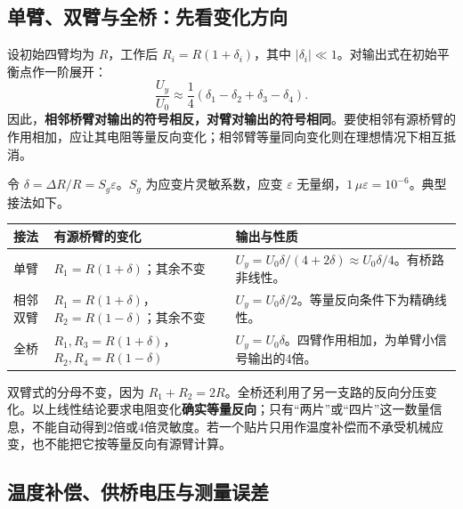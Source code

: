 \subsection{单臂、双臂与全桥：先看变化方向}

设初始四臂均为 $R$，工作后 $R_i=R(1+\delta_i)$，其中 $|\delta_i|\ll1$。对输出式在初始平衡点作一阶展开：
\[
\boxed{\frac{U_y}{U_0}\approx\frac14(\delta_1-\delta_2+\delta_3-\delta_4)}.
\]
因此，\textbf{相邻桥臂对输出的符号相反，对臂对输出的符号相同}。要使相邻有源桥臂的作用相加，应让其电阻等量反向变化；相邻臂等量同向变化则在理想情况下相互抵消。

令 $\delta=\Delta R/R=S_g\varepsilon$。$S_g$ 为应变片灵敏系数，应变 $\varepsilon$ 无量纲，$1\,\mu\varepsilon=10^{-6}$。典型接法如下。

\begin{table}[H]
\centering\small
\begin{tabularx}{\linewidth}{@{}p{1.5cm} p{4.25cm} X@{}}
\toprule
接法 & 有源桥臂的变化 & 输出与性质 \\
\midrule
单臂 & $R_1=R(1+\delta)$；其余不变 & $U_y=U_0\delta/(4+2\delta)\approx U_0\delta/4$。有桥路非线性。 \\
相邻双臂 & $R_1=R(1+\delta)$，$R_2=R(1-\delta)$；其余不变 & $U_y=U_0\delta/2$。等量反向条件下为精确线性。 \\
全桥 & $R_1,R_3=R(1+\delta)$，$R_2,R_4=R(1-\delta)$ & $U_y=U_0\delta$。四臂作用相加，为单臂小信号输出的4倍。 \\
\bottomrule
\end{tabularx}
\end{table}

双臂式的分母不变，因为 $R_1+R_2=2R$。全桥还利用了另一支路的反向分压变化。以上线性结论要求电阻变化\textbf{确实等量反向}；只有“两片”或“四片”这一数量信息，不能自动得到2倍或4倍灵敏度。若一个贴片只用作温度补偿而不承受机械应变，也不能把它按等量反向有源臂计算。


\subsection{温度补偿、供桥电压与测量误差}

